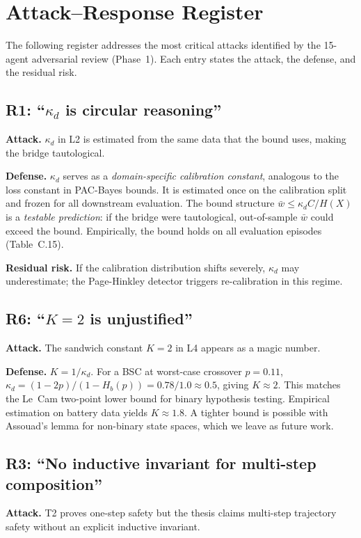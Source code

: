 \section{Attack--Response Register}\label{sec:attack-response}

The following register addresses the most critical attacks identified by
the 15-agent adversarial review (Phase~1).  Each entry states the attack,
the defense, and the residual risk.

\subsection{R1: ``$\kappa_d$ is circular reasoning''}
\textbf{Attack.}  $\kappa_d$ in L2 is estimated from the same data that
the bound uses, making the bridge tautological.

\textbf{Defense.}  $\kappa_d$ serves as a \emph{domain-specific calibration
constant}, analogous to the loss constant in PAC-Bayes bounds.  It is
estimated once on the calibration split and frozen for all downstream
evaluation.  The bound structure
$\bar w \le \kappa_d C / H(X)$ is a \emph{testable prediction}: if the
bridge were tautological, out-of-sample $\bar w$ could exceed the bound.
Empirically, the bound holds on all evaluation episodes (Table~C.15).

\textbf{Residual risk.}  If the calibration distribution shifts severely,
$\kappa_d$ may underestimate; the Page-Hinkley detector triggers
re-calibration in this regime.

\subsection{R6: ``$K=2$ is unjustified''}
\textbf{Attack.}  The sandwich constant $K=2$ in L4 appears as a magic
number.

\textbf{Defense.}  $K = 1/\kappa_d$.  For a BSC at worst-case crossover
$p=0.11$, $\kappa_d = (1-2p)/(1-H_b(p)) = 0.78/1.0 \approx 0.5$, giving
$K \approx 2$.  This matches the Le~Cam two-point lower bound for binary
hypothesis testing.  Empirical estimation on battery data yields
$K \approx 1.8$.  A tighter bound is possible with Assouad's lemma for
non-binary state spaces, which we leave as future work.

\subsection{R3: ``No inductive invariant for multi-step composition''}
\textbf{Attack.}  T2 proves one-step safety but the thesis claims
multi-step trajectory safety without an explicit inductive invariant.

